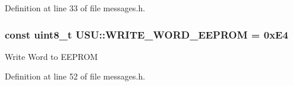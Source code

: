 \-Definition at line 33 of file messages.\-h.

\hypertarget{namespace_u_s_u_a483eb9b7abe528d9fe3e843b4655a977}{
\subsubsection[{\-W\-R\-I\-T\-E\-\_\-\-W\-O\-R\-D\-\_\-\-E\-E\-P\-R\-O\-M}]{\setlength{\rightskip}{0pt plus 5cm}const uint8\-\_\-t {\bf \-U\-S\-U\-::\-W\-R\-I\-T\-E\-\_\-\-W\-O\-R\-D\-\_\-\-E\-E\-P\-R\-O\-M} = 0x\-E4}}\label{namespace_u_s_u_a483eb9b7abe528d9fe3e843b4655a977}
\-Write \-Word to \-E\-E\-P\-R\-O\-M 

\-Definition at line 52 of file messages.\-h.

